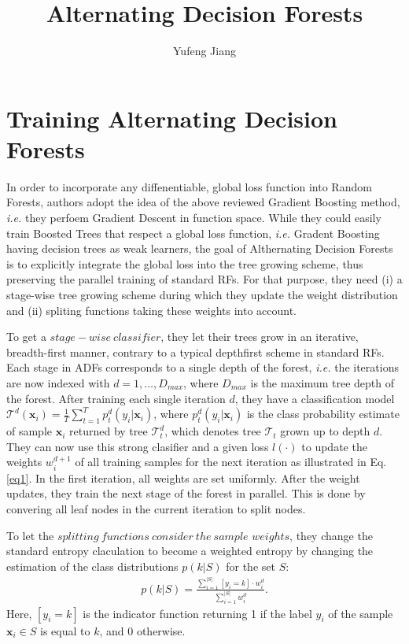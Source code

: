 \documentclass[10pt,twocolumn,letterpaper]{article}
\begin{document}
\title{Alternating Decision Forests}
\author{Yufeng Jiang}
\maketitle
\balance

\section{Training Alternating Decision Forests}

In order to incorporate any diffenentiable, global loss function into Random Forests, authors adopt the idea of the above reviewed Gradient Boosting method, \emph{i.e.} they perfoem Gradient Descent in function space. While they could easily train Boosted Trees that respect a global loss function, \emph{i.e.} Gradent Boosting having decision trees as weak learners, the goal of Althernating Decision Forests is to explicitly integrate the global loss into the tree growing scheme, thus preserving the parallel training of standard RFs. For that purpose, they need (i) a stage-wise tree growing scheme during which they update the weight distribution and (ii) spliting functions taking these weights into account.

To get a $stage-wise~classifier$, they let their trees grow in an iterative, breadth-first manner, contrary to a typical depthfirst scheme in standard RFs. Each stage in ADFs corresponds to a single depth of the forest, \emph{i.e.} the iterations are now indexed with $d = 1, \dots, D_{max}$, where $D_{max}$ is the maximum tree depth of the forest. After training each single iteration $d$, they have a classification model $\mathcal{T}^d(\mathbf{x}_i) = \frac{1}{T}\sum_{t=1}^Tp_t^d(y_i|\mathbf{x}_i)$, where $p_t^d(y_i|\mathbf{x}_i)$ is the class probability estimate of sample $\mathbf{x}_i$ returned by tree $\mathcal{T}_t^d$, which denotes tree $\mathcal{T}_t$ grown up to depth $d$. They can now use this strong clasifier and a given loss $l(\cdot)$ to update the weights $w_i^{d+1}$ of all training samples for the next iteration as illustrated in Eq. \ref{eq1}. In the first iteration, all weights are set uniformly. After the weight updates, they train the next stage of the forest in parallel. This is done by convering all leaf nodes in the current iteration to split nodes.

To let the $splitting~functions~consider~the~sample$ $weights$, they change the standard entropy claculation to become a weighted entropy by changing the estimation of the class distributions $p(k|S)$ for the set $S$:\\
\begin{gather*}
p(k|S) = \frac{\sum_{i=1}^{|S|}[y_i = k]\cdot w_i^d}{\sum_{i=1}^{|S|}w_i^d}.
\tag{1}
\label{eq1}
\end{gather*}
Here, $[y_i = k]$ is the indicator function returning 1 if the label $y_i$ of the sample $\mathbf{x}_i \in S$ is equal to $k$, and 0 otherwise. 
\end{document}
